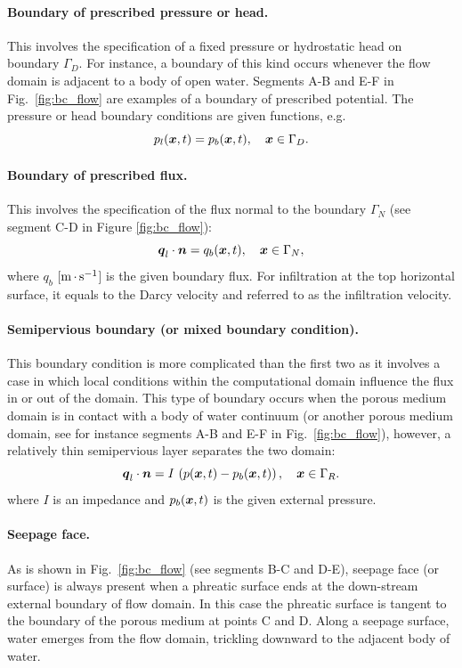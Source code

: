 \paragraph{Boundary of prescribed pressure or head.}
This involves the specification of a fixed pressure or hydrostatic head on boundary $\Gamma_D$.
For instance, a boundary of this kind occurs whenever the flow domain is adjacent to a body of open water.
Segments A-B and E-F in Fig.~\ref{fig:bc_flow} are examples of a boundary of prescribed potential.
The pressure or head boundary conditions are given functions, e.g.
\begin{equation}
  p_l({\boldsymbol{x}},t) = p_{b}({\boldsymbol{x}},t), \quad {\boldsymbol{x}} \in \Gamma_D. 
\end{equation}

\paragraph{Boundary of prescribed flux.}
This involves the specification of the flux normal to the boundary $\Gamma_N$
(see segment C-D in Figure \ref{fig:bc_flow}):
\begin{equation}
  {\boldsymbol{q}}_l\cdot \boldsymbol{n} = q_{b}({\boldsymbol{x}},t), \quad {\boldsymbol{x}} \in \Gamma_N,
\end{equation}
where $q_b$ [${\rm m}{\,\cdot\,}{\rm s}^{-1}$] is the given boundary flux. 
For infiltration at the top horizontal surface, it equals to the Darcy velocity
and referred to as the infiltration velocity.

\paragraph{Semipervious boundary (or mixed boundary condition).}
This boundary condition is more complicated than the first two as it involves a case 
in which local conditions within the computational domain influence the flux in or 
out of the domain.
This type of boundary occurs when the porous medium domain is in contact with 
a body of water continuum (or another porous medium domain, see for instance segments 
A-B and E-F in Fig.~\ref{fig:bc_flow}), however, a relatively thin semipervious layer 
separates the two domain:
\begin{equation}
  {\boldsymbol{q}}_l \cdot \boldsymbol{n} = I\, \left(p ({\boldsymbol{x}},t) - p_{b}({\boldsymbol{x}},t) \right), \quad {\boldsymbol{x}} \in \Gamma_R.
\end{equation}
where $I$ is an impedance and $p_{b}({\boldsymbol{x}},t)$ is the given external pressure.

\paragraph{Seepage face.}
As is shown in Fig.~\ref{fig:bc_flow} (see segments B-C and D-E), seepage face (or surface) 
is always present when a phreatic surface ends at the down-stream external boundary of flow domain.
In this case the phreatic surface is tangent to the boundary of the porous medium at points C and D.
Along a seepage surface, water emerges from the flow domain, trickling downward to the adjacent body of water.

